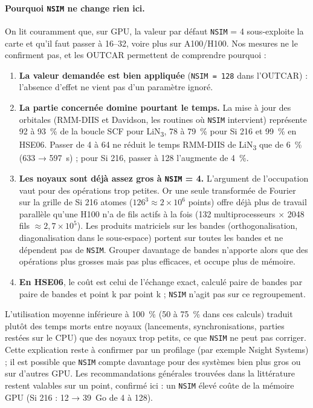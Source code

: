 \documentclass[11pt,a4paper]{article}
\begin{document}
\paragraph{Pourquoi \texttt{NSIM} ne change rien ici.} On lit couramment que, sur GPU, la
valeur par défaut \texttt{NSIM} = 4 sous-exploite la carte et qu'il faut passer à 16--32,
voire plus sur A100/H100. Nos mesures ne le confirment pas, et les OUTCAR permettent de
comprendre pourquoi :
\begin{enumerate}
  \item \textbf{La valeur demandée est bien appliquée} (\texttt{NSIM = 128} dans l'OUTCAR) :
        l'absence d'effet ne vient pas d'un paramètre ignoré.
  \item \textbf{La partie concernée domine pourtant le temps.} La mise à jour des orbitales
        (RMM-DIIS et Davidson, les routines où \texttt{NSIM} intervient) représente 92 à
        \SI{93}{\percent} de la boucle SCF pour LiN\textsubscript{3}, 78 à \SI{79}{\percent} pour
        Si 216 et \SI{99}{\percent} en HSE06. Passer de 4 à 64 ne réduit le temps RMM-DIIS de
        LiN\textsubscript{3} que de \SI{6}{\percent} (\SI{633}{} → \SI{597}{s}) ; pour Si 216,
        passer à 128 l'augmente de \SI{4}{\percent}.
  \item \textbf{Les noyaux sont déjà assez gros à \texttt{NSIM} = 4.} L'argument de
        l'occupation vaut pour des opérations trop petites. Or une seule transformée de Fourier
        sur la grille de Si 216 atomes ($126^3 \approx 2\times10^6$ points) offre déjà plus de
        travail parallèle qu'une H100 n'a de fils actifs à la fois (132 multiprocesseurs
        $\times$ 2048 fils $\approx 2{,}7\times10^5$). Les produits matriciels sur les bandes
        (orthogonalisation, diagonalisation dans le sous-espace) portent sur toutes les bandes
        et ne dépendent pas de \texttt{NSIM}. Grouper davantage de bandes n'apporte alors que
        des opérations plus grosses mais pas plus efficaces, et occupe plus de mémoire.
  \item \textbf{En HSE06}, le coût est celui de l'échange exact, calculé paire de bandes par
        paire de bandes et point k par point k ; \texttt{NSIM} n'agit pas sur ce
        regroupement.
\end{enumerate}
L'utilisation moyenne inférieure à \SI{100}{\percent} (50 à \SI{75}{\percent} dans ces calculs)
traduit plutôt des temps morts entre noyaux (lancements, synchronisations, parties restées sur
le CPU) que des noyaux trop petits, ce que \texttt{NSIM} ne peut pas corriger. Cette
explication reste à confirmer par un profilage (par exemple Nsight Systems) ; il est possible
que \texttt{NSIM} compte davantage pour des systèmes bien plus gros ou sur d'autres GPU. Les
recommandations générales trouvées dans la littérature restent valables sur un point,
confirmé ici : un \texttt{NSIM} élevé coûte de la mémoire GPU (Si 216 : \SI{12}{} →
\SI{39}{Go} de 4 à 128).
\end{document}
